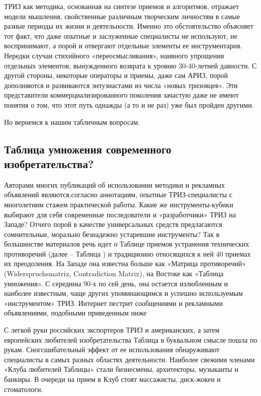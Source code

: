 \documentclass[11pt,a4paper]{article}
\begin{document}
ТРИЗ как методика, основанная на синтезе приемов и алгоритмов, отражает модели
мышления, свойственные различным творческим личностям в самые разные периоды
их жизни и деятельности. Именно это обстоятельство объясняет тот факт, что
даже опытные и заслуженные специалисты не используют, не воспринимают, а порой
и отвергают отдельные элементы ее инструментария. Нередки случаи стихийного
«переосмысливания», наивного упрощения отдельных элементов, вынужденного
возврата к уровню 30-40-летней давности. С другой стороны, некоторые операторы
и приемы, даже сам АРИЗ, порой дополняются и развиваются энтузиастами из числа
«новых тризовцев». Эти представители коммерциализированного поколения зачастую
даже не имеют понятия о том, что этот путь однажды (а то и не раз) уже был
пройден другими.

Но вернемся к нашим табличным вопросам.

\subsection*{Таблица умножения современного изобретательства?}

Авторами многих публикаций об использовании методики и рекламных объявлений
являются,согласно аннотациям, опытные ТРИЗ-специалисты с многолетним стажем
практической работы. Какие же инструменты-кубики выбирают для себя современные
последователи и «разработчики» ТРИЗ на Западе? Отчего порой в качестве
универсальных средств предлагаются сомнительные, морально безнадежно
устаревшие инструменты? Так в большинстве материалов речь идет о Таблице
приемов устранения технических противоречий (далее -- Таблица ) и традиционно
относящихся к ней 40 приемах их преодоления. На Западе она известна больше как
«Матрица противоречий» (Widerspruchsmatrix, Contradiction Matrix), на Востоке
как «Таблица умножения». С середины 90-х по сей день, она остается излюбленным
и наиболее известным, чаще других упоминающимся и успешно используемым
«инструментом» ТРИЗ. Интернет пестрит сообщениями и рекламными объявлениями,
подобными приведенным ниже

С легкой руки российских экспортеров ТРИЗ и американских, а затем европейских
любителей изобретательства Таблица в буквальном смысле пошла по
рукам. Сногсшибательный эффект от ее использования обнаруживают специалисты в
самых разных областях деятельности. Наиболее свежими членами «Клуба любителей
Таблицы» стали бизнесмены, архитекторы, музыканты и банкиры. В очереди на
прием в Клуб стоят массажисты, диск-жокеи и стоматологи.
\end{document}
